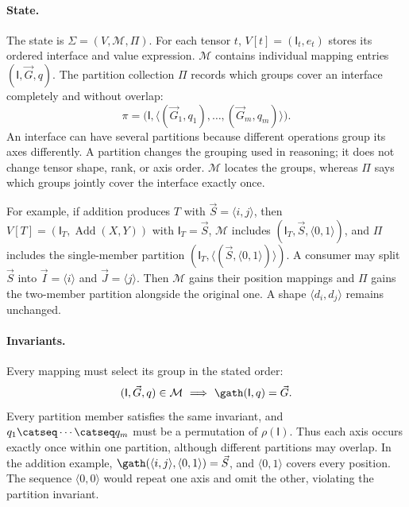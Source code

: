 \paragraph{State.}
The state is $\Sigma=(V,\mathcal M,\Pi)$. For each tensor $t$,
$V[t]=(\mathsf{I}_t,e_t)$ stores its ordered interface and value expression.
$\mathcal M$ contains individual mapping entries $(\mathsf{I},\vec G,q)$. The partition collection
$\Pi$ records which groups cover an interface completely and without overlap:
\begin{equation}
 \pi=\bigl(\mathsf{I},\langle(\vec G_1,q_1),\ldots,(\vec G_m,q_m)\rangle\bigr).
\end{equation}
An interface can have several partitions because different operations group
its axes differently. A partition changes the grouping used in reasoning;
it does not change tensor shape, rank, or axis order. $\mathcal M$ locates the groups,
whereas $\Pi$ says which groups jointly cover the interface exactly once.

For example, if addition produces $T$ with $\vec S=\langle i,j\rangle$, then
$V[T]=(\mathsf{I}_T,\operatorname{Add}(X,Y))$ with $\mathsf{I}_T=\vec S$,
$\mathcal M$ includes $(\mathsf{I}_T,\vec S,\langle0,1\rangle)$, and $\Pi$ includes the single-member
partition $(\mathsf{I}_T,\langle(\vec S,\langle0,1\rangle)\rangle)$. A consumer may split
$\vec S$ into $\vec I=\langle i\rangle$ and $\vec J=\langle j\rangle$. Then $\mathcal M$ gains their
position mappings and $\Pi$ gains the two-member partition alongside the
original one. A shape $\langle d_i,d_j\rangle$ remains unchanged.

\paragraph{Invariants.}
Every mapping must select its group in the stated order:
\begin{equation}
 (\mathsf{I},\vec G,q)\in \mathcal M\ \Longrightarrow\ \gath(\mathsf{I},q)=\vec G.
 \label{extended:eq:mapping-invariant}
\end{equation}
Every partition member satisfies the same invariant, and
$q_1\catseq\cdots\catseq q_m$ must be a permutation of $\rho(\mathsf{I})$.
Thus each axis occurs exactly once within one partition, although different
partitions may overlap. In the addition example,
$\gath(\langle i,j\rangle,\langle0,1\rangle)=\vec S$, and $\langle0,1\rangle$
covers every position. The sequence $\langle0,0\rangle$ would repeat one
axis and omit the other, violating the partition invariant.



